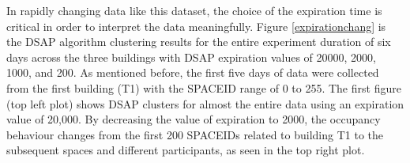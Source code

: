 
In rapidly changing data like this dataset, the choice of the expiration time is critical in order to interpret the data meaningfully. Figure \ref{expirationchang} is the DSAP algorithm clustering results for the entire experiment duration of six days across the three buildings with DSAP expiration values of 20000, 2000, 1000, and 200. As mentioned before, the first five days of data were collected from the first building (T1) with the SPACEID range of 0 to 255. The first figure (top left plot) shows DSAP clusters for almost the entire data using an expiration value of 20,000. By decreasing the value of expiration to 2000, the occupancy behaviour changes from the first 200 SPACEIDs related to building T1 to the subsequent spaces and different participants, as seen in the top right plot.


